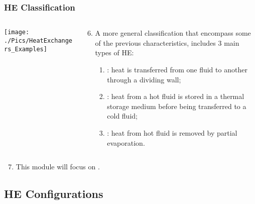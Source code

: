 \documentclass[10pt,compress,unknownkeysallowed]{beamer}
\begin{document}
\begin{frame}
 \frametitle{HE Classification}
    \begin{columns}
       \begin{column}[l]{0.58\linewidth}
         \texttt{[image: ./Pics/HeatExchangers\_Examples]}
       \end{column}
       \begin{column}[l]{0.42\linewidth}
          \begin{enumerate}\setcounter{enumi}{5}%
              \item<1-> A more general classification that encompass some of the previous characteristics, includes 3 main types of HE:
                \begin{enumerate}
                  \item<1-> : heat is transferred from one fluid to another through a dividing wall;
                  \item<2-> : heat from a hot fluid is stored in a thermal storage medium before being transferred to a cold fluid;
                  \item<3-> : heat from hot fluid is removed by partial evaporation.
                \end{enumerate}
          \end{enumerate}
       \end{column}      
    \end{columns}
          \begin{enumerate}\setcounter{enumi}{6}%
               \item<4-> This module will focus on \underline{}.
          \end{enumerate}
\end{frame}


\subsection{HE Configurations}
\end{document}
